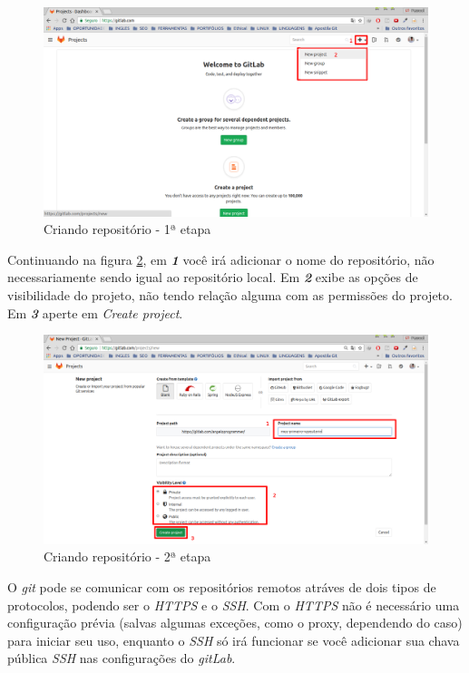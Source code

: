 \documentclass[12pt,openright,oneside,a4paper,english,brazil]{abntex2}
\begin{document}
\begin{figure}[h]
	\caption{\label{criandorep1}Criando repositório - 1ª etapa}
	\begin{center}
		\includegraphics[width=1\linewidth]{imagens/criandorep1}
	\end{center}
\end{figure}

Continuando na figura \ref{criandorep2}, em \textbf{\textit{1}} você irá adicionar o nome do repositório, não necessariamente sendo igual ao repositório local. Em \textbf{\textit{2}} exibe as opções de visibilidade do projeto, não tendo relação alguma com as permissões do projeto. Em \textbf{\textit{3}} aperte em \textit{Create project}.

\begin{figure}[h]
	\caption{\label{criandorep2}Criando repositório - 2ª etapa}
	\begin{center}
		\includegraphics[width=1\linewidth]{imagens/criandorep2}
	\end{center}
\end{figure}

O \textit{git} pode se comunicar com os repositórios remotos atráves de dois tipos de protocolos, podendo ser o \textit{HTTPS} e o \textit{SSH}. Com o \textit{HTTPS} não é necessário uma configuração prévia (salvas algumas exceções, como o proxy, dependendo do caso) para iniciar seu uso, enquanto o \textit{SSH} só irá funcionar se você adicionar sua chava pública \textit{SSH} nas configurações do \textit{gitLab}.
\end{document}
